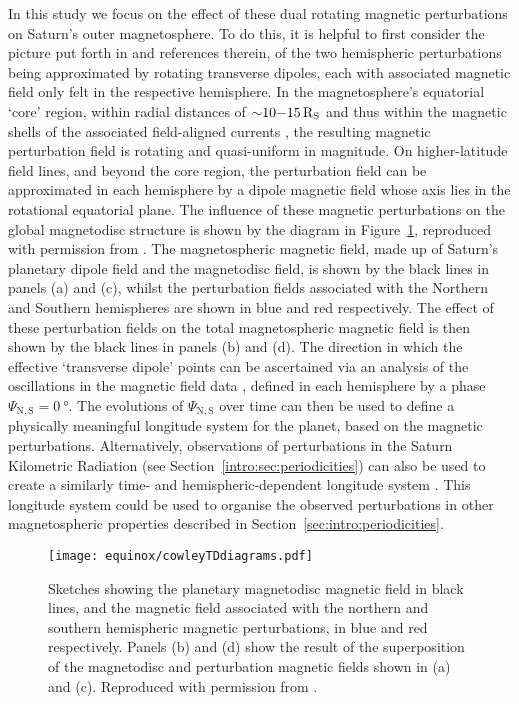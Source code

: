 In this study we focus on the effect of these dual rotating magnetic perturbations on Saturn's outer magnetosphere. To do this, it is helpful to first consider the picture put forth in \citet{andrews2010, provan2011} and references therein, of the two hemispheric perturbations being approximated by rotating transverse dipoles, each with associated magnetic field only felt in the respective hemisphere. In the magnetosphere's equatorial `core' region, within radial distances of ${\sim}10{\--}\SI{15}{R_S}$ and thus within the magnetic shells of the associated field-aligned currents \citep[e.g.][]{southwood2007}, the resulting magnetic perturbation field is rotating and quasi-uniform in magnitude. On higher-latitude field lines, and beyond the core region, the perturbation field can be approximated in each hemisphere by a dipole magnetic field whose axis lies in the rotational equatorial plane. The influence of these magnetic perturbations on the global magnetodisc structure is shown by the diagram in Figure~\ref{equinox:fig:CowleyTDdiagrams}, reproduced with permission from \citet{cowley2017a}. The magnetospheric magnetic field, made up of Saturn's planetary dipole field and the magnetodisc field, is shown by the black lines in panels (a) and (c), whilst the perturbation fields associated with the Northern and Southern hemispheres are shown in blue and red respectively. The effect of these perturbation fields on the total magnetospheric magnetic field is then shown by the black lines in panels (b) and (d). The direction in which the effective `transverse dipole' points can be ascertained via an analysis of the oscillations in the magnetic field data \citep[e.g.][]{provan2009}, defined in each hemisphere by a phase $\Psi_\mathrm{N,S} = \SI{0}{\degree}$. The evolutions of $\Psi_\mathrm{N,S}$ over time can then be used  to define a physically meaningful longitude system for the planet, based on the magnetic perturbations. Alternatively, observations of perturbations in the Saturn Kilometric Radiation (see Section~\ref{intro:sec:periodicities}) can also be used to create a similarly time- and hemispheric-dependent longitude system \citep[e.g.][]{gurnett2011}. This longitude system could be used to organise the observed perturbations in other magnetospheric properties described in Section~\ref{sec:intro:periodicities}. 

\begin{figure}
\centering
\texttt{[image: equinox/cowleyTDdiagrams.pdf]}
\caption[Sketches of hemispheric rotating magnetic perturbation fields, from \citet{cowley2017a}.]{Sketches showing the planetary magnetodisc magnetic field in black lines, and the magnetic field associated with the northern and southern hemispheric magnetic perturbations, in blue and red respectively. Panels (b) and (d) show the result of the superposition of the magnetodisc and perturbation magnetic fields shown in (a) and (c). Reproduced with permission from \citet{cowley2017a}.}
\label{equinox:fig:CowleyTDdiagrams}
\end{figure}


